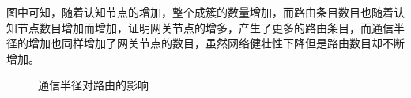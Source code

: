 \documentclass[a4paper,AutoFakeBold,oneside,12pt]{book}
\begin{document}
  图中可知，随着认知节点的增加，整个成簇的数量增加，而路由条目数目也随着认知节点数目增加而增加，证明网关节点的增多，产生了更多的路由条目，而通信半径的增加也同样增加了网关节点的数目，虽然网络健壮性下降但是路由数目却不断增加。
\begin{figure}[htbp]
\centering  
  \caption{通信半径对路由的影响}  
  \label{fig:2}               
   \end{figure}
   
\end{document}
